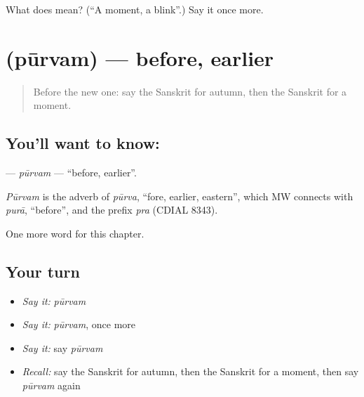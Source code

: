 \begin{tcolorbox}[breakable,colback=teal!4,colframe=teal!35!black,title={Before you move on}]
What does  mean? (\textquotedblleft{}A moment, a blink\textquotedblright{}.) Say it once more.
\end{tcolorbox}
\section[\texorpdfstring{\sk{पूर्वम्} (pūrvam)}{पूर्वम् (pūrvam)}]{ (pūrvam) — before, earlier}

\label{lesson:SA-C92-purvam}



\begin{quote}
Before the new one: say the Sanskrit for autumn, then the Sanskrit for a moment.
\end{quote}

\subsection*{You'll want to know: }
\textbf{} — \emph{pūrvam} — \textquotedblleft{}before, earlier\textquotedblright{}.

\begin{cousinweb}
\emph{Pūrvam} is the adverb of \emph{pūrva}, \textquotedblleft{}fore, earlier, eastern\textquotedblright{}, which MW connects with \emph{purā}, \textquotedblleft{}before\textquotedblright{}, and the prefix \emph{pra} (CDIAL 8343).
\end{cousinweb}

\begin{grammarlens}[title={What you've built}]
One more word for this chapter.
\end{grammarlens}

\subsection*{Your turn}
\begin{itemize}
\raggedright
  \item \emph{Say it:} \emph{pūrvam}
  \item \emph{Say it:} \emph{pūrvam}, once more
  \item \emph{Say it:} say \emph{pūrvam}
  \item \emph{Recall:} say the Sanskrit for autumn, then the Sanskrit for a moment, then say \emph{pūrvam} again
\end{itemize}

